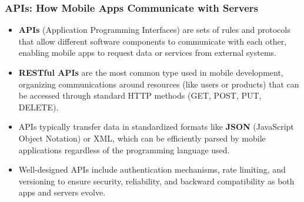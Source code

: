 \documentclass{beamer}
\begin{document}
	\begin{frame}
		\frametitle{APIs: How Mobile Apps Communicate with Servers}
		
		\begin{itemize}
			\item \textbf{APIs} (Application Programming Interfaces) are sets of rules and protocols that allow different software components to communicate with each other, enabling mobile apps to request data or services from external systems.
			\item \textbf{RESTful APIs} are the most common type used in mobile development, organizing communications around resources (like users or products) that can be accessed through standard HTTP methods (GET, POST, PUT, DELETE).
			\item APIs typically transfer data in standardized formats like \textbf{JSON} (JavaScript Object Notation) or XML, which can be efficiently parsed by mobile applications regardless of the programming language used.
			\item Well-designed APIs include authentication mechanisms, rate limiting, and versioning to ensure security, reliability, and backward compatibility as both apps and servers evolve.
		\end{itemize}
			
	\end{frame}
	
\end{document}
